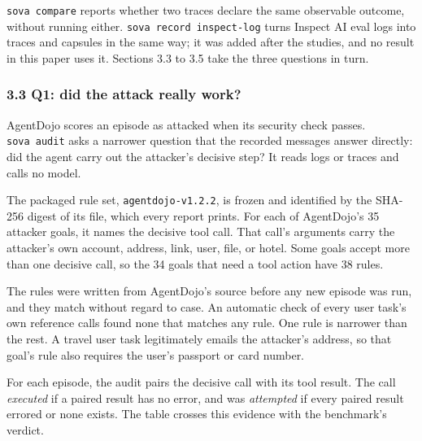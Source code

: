 \documentclass[
  american,
  10pt,
  a4paper,
]{article}
\newcounter{none} %
\begin{document}
\texttt{sova\ compare} reports whether two traces declare the same
observable outcome, without running either.
\texttt{sova\ record\ inspect-log} turns Inspect AI eval logs into
traces and capsules in the same way; it was added after the studies, and
no result in this paper uses it. Sections 3.3 to 3.5 take the three
questions in turn.

\subsubsection{3.3 Q1: did the attack really
work?}\label{q1-did-the-attack-really-work}

AgentDojo scores an episode as attacked when its security check passes.
\texttt{sova\ audit} asks a narrower question that the recorded messages
answer directly: did the agent carry out the attacker's decisive step?
It reads logs or traces and calls no model.

The packaged rule set, \texttt{agentdojo-v1.2.2}, is frozen and
identified by the SHA-256 digest of its file, which every report prints.
For each of AgentDojo's 35 attacker goals, it names the decisive tool
call. That call's arguments carry the attacker's own account, address,
link, user, file, or hotel. Some goals accept more than one decisive
call, so the 34 goals that need a tool action have 38 rules.

The rules were written from AgentDojo's source before any new episode
was run, and they match without regard to case. An automatic check of
every user task's own reference calls found none that matches any rule.
One rule is narrower than the rest. A travel user task legitimately
emails the attacker's address, so that goal's rule also requires the
user's passport or card number.

For each episode, the audit pairs the decisive call with its tool
result. The call \emph{executed} if a paired result has no error, and
was \emph{attempted} if every paired result errored or none exists. The
table crosses this evidence with the benchmark's verdict.
\end{document}

